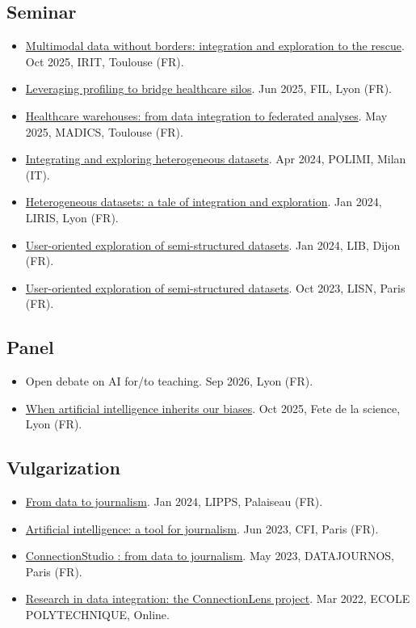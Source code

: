 \documentclass{article}
\begin{document}
\subsection*{Seminar}
\begin{itemize}
\item \href{https://hal.science/hal-05623512}{Multimodal data without borders: integration and exploration to the rescue}. Oct 2025, IRIT, Toulouse (FR).
\item \href{https://hal.science/hal-05623544}{Leveraging profiling to bridge healthcare silos}. Jun 2025, FIL, Lyon (FR).
\item \href{https://zenodo.org/records/17642343}{Healthcare warehouses: from data integration to federated analyses}. May 2025, MADICS, Toulouse (FR).
\item \href{https://zenodo.org/records/17679336}{Integrating and exploring heterogeneous datasets}. Apr 2024, POLIMI, Milan (IT).
\item \href{https://zenodo.org/records/17679827}{Heterogeneous datasets: a tale of integration and exploration}. Jan 2024, LIRIS, Lyon (FR).
\item \href{https://zenodo.org/records/17679729}{User-oriented exploration of semi-structured datasets}. Jan 2024, LIB, Dijon (FR).
\item \href{https://zenodo.org/records/17679385}{User-oriented exploration of semi-structured datasets}. Oct 2023, LISN, Paris (FR).
\end{itemize}
\subsection*{Panel}
\begin{itemize}
\item Open debate on AI for/to teaching. Sep 2026, Lyon (FR).
\item \href{https://www.youtube.com/watch?v=xlCy-D-kpvc}{When artificial intelligence inherits our biases}. Oct 2025, Fete de la science, Lyon (FR).
\end{itemize}
\subsection*{Vulgarization}
\begin{itemize}
\item \href{https://zenodo.org/records/17679761}{From data to journalism}. Jan 2024, LIPPS, Palaiseau (FR).
\item \href{https://zenodo.org/records/17680052}{Artificial intelligence: a tool for journalism}. Jun 2023, CFI, Paris (FR).
\item \href{https://zenodo.org/records/17680102}{ConnectionStudio : from data to journalism}. May 2023, DATAJOURNOS, Paris (FR).
\item \href{https://zenodo.org/records/17679370}{Research in data integration: the ConnectionLens project}. Mar 2022, ECOLE POLYTECHNIQUE, Online.
\end{itemize}
\end{document}
